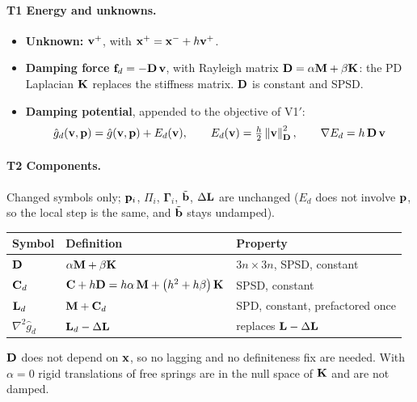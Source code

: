 \paragraph{T1 Energy and unknowns.}\mbox{}
\begin{itemize}
    \item \textbf{Unknown:} $\mathbf{v}^+$, with $\mathbf{x}^+ = \mathbf{x}^- + h\mathbf{v}^+$.
    \item \textbf{Damping force} $\mathbf{f}_d = -\mathbf{D}\,\mathbf{v}$, with Rayleigh matrix $\mathbf{D} = \alpha\mathbf{M} + \beta\mathbf{K}$: the PD Laplacian $\mathbf{K}$ replaces the stiffness matrix. $\mathbf{D}$ is constant and SPSD.
    \item \textbf{Damping potential}, appended to the objective of V1$'$:
    \begin{equation*}
        \hat g_d(\mathbf{v}, \mathbf{p}) = \hat g(\mathbf{v}, \mathbf{p}) + E_d(\mathbf{v}),
        \qquad
        E_d(\mathbf{v}) = \tfrac{h}{2}\left\|\mathbf{v}\right\|^2_{\mathbf{D}},
        \qquad
        \nabla E_d = h\,\mathbf{D}\,\mathbf{v}
    \end{equation*}
\end{itemize}
\paragraph{T2 Components.}\mbox{}
\newline Changed symbols only; $\mathbf{p}_i$, $\Pi_i$, $\boldsymbol{\Gamma}_i$, $\tilde{\mathbf{b}}$, $\Delta\mathbf{L}$ are unchanged ($E_d$ does not involve $\mathbf{p}$, so the local step is the same, and $\tilde{\mathbf{b}}$ stays undamped).
\begin{center}
\renewcommand{\arraystretch}{1.4}
\begin{tabular}{lll}
\textbf{Symbol} & \textbf{Definition} & \textbf{Property} \\ \hline
$\mathbf{D}$        & $\alpha\mathbf{M} + \beta\mathbf{K}$ & $3n\times 3n$, SPSD, constant \\
$\mathbf{C}_d$       & $\mathbf{C} + h\mathbf{D} = h\alpha\,\mathbf{M} + \left(h^2 + h\beta\right)\mathbf{K}$ & SPSD, constant \\
$\mathbf{L}_d$      & $\mathbf{M} + \mathbf{C}_d$ & SPD, constant, prefactored once \\
$\nabla^2\hat g_d$ & $\mathbf{L}_d - \Delta\mathbf{L}$ & replaces $\mathbf{L} - \Delta\mathbf{L}$ \\
\end{tabular}
\end{center}
\noindent $\mathbf{D}$ does not depend on $\mathbf{x}$, so no lagging and no definiteness fix are needed. With $\alpha = 0$ rigid translations of free springs are in the null space of $\mathbf{K}$ and are not damped. %

